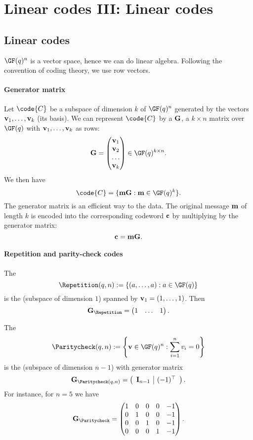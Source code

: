 \documentclass[a4paper, 11pt, openany]{book}
\begin{document}
\section{Linear codes III: Linear codes}
\label{sec:23}





\subsection{Linear codes}

$\GF(q)^n$ is a vector space, hence we can do linear algebra. Following the convention of coding theory, we use row vectors.

\paragraph{Generator matrix}
Let $\code{C}$ be a subspace of dimension $k$ of $\GF(q)^n$ generated by the vectors ${\bf v}_1, \ldots, {\bf v}_k$ (its basis). We can represent $\code{C}$ by a  ${\bf G}$, a $k \times n$ matrix over $\GF(q)$ with ${\bf v}_1,\ldots,{\bf v}_k$ as rows:
\[
    {\bf G} = \begin{pmatrix}
    {\bf v}_1\\
    {\bf v}_2\\
    \dots\\
    {\bf v}_k
    \end{pmatrix} \in \GF(q)^{k \times n}.
\]
We then have
\[
	\code{C} = \{{\bf m}{\bf G}: {\bf m} \in \GF(q)^k\}.
\]
The generator matrix is  an efficient way to  the data. The original message ${\bf m}$ of length $k$ is encoded into the corresponding codeword ${\bf c}$ by multiplying by the generator matrix:
\[
    {\bf c} = {\bf m}{\bf G}.
\]

\paragraph{Repetition and parity-check codes}
The 
\[
    \Repetition(q,n) :=  \left\{ (a,\dots,a) : a \in \GF(q) \right\}
\]
is the  (subspace of dimension $1$) spanned by ${\bf v}_1 = (1,\ldots,1)$. Then
\[
	{\bf G}_{\Repetition} = \begin{pmatrix} 1 & \ldots & 1 \end{pmatrix}.
\]


The 
\[
    \Paritycheck(q,n) := \left\{ {\bf v} \in \GF(q)^n : \sum_{i=1}^n v_i = 0 \right\}
\]
is the  (subspace of dimension $n-1$) with generator matrix
\[
    {\bf G}_{\Paritycheck(q,n)} = \left( \begin{array}{c|c}
    {\bf I}_{n-1} & (-1)^\top
    \end{array}\right).
\]
For instance, for $n=5$ we have
\[
	{\bf G}_{\Paritycheck} = \begin{pmatrix}
	 1 & 0 & 0 & 0 & -1\\
	 0 & 1 & 0 & 0 & -1\\
	0 & 0 & 1 & 0 & -1\\
	0 & 0 & 0 & 1 & -1
	\end{pmatrix}.
\]
\end{document}
